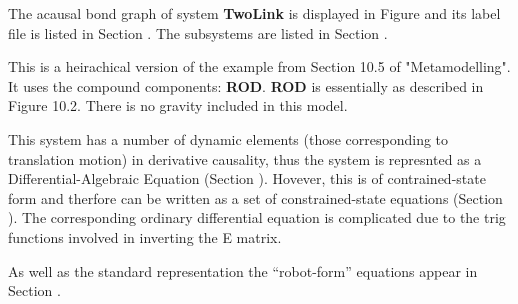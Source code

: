
%

   The acausal bond graph of system \textbf{TwoLink} is
   displayed in Figure  and its label
   file is listed in Section .
   The subsystems are listed in Section .

This is a heirachical version of the example from Section 10.5 of
"Metamodelling".  It uses the compound components: {\bf ROD}.  {\bf
ROD} is essentially as described in Figure 10.2.
There is no gravity included in this model.

This system has a number of dynamic elements (those corresponding to
translation motion) in derivative causality, thus the system is
represnted as a Differential-Algebraic Equation (Section
). Hovever, this is of contrained-state form
and therfore can be written as a set of constrained-state equations
(Section ). The corresponding ordinary
differential equation is complicated due to the trig functions
involved in inverting the E matrix.

As well as the standard representation the ``robot-form'' equations
appear in Section  . 

